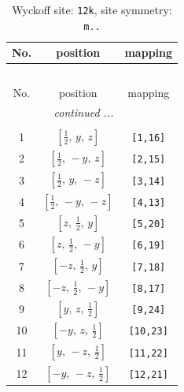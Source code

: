 \documentclass[fleqn,8pt]{jsarticle}
\begin{document}
\begin{longtable}{ccc}
\caption{Wyckoff site: {\tt 12k}, site symmetry: {\tt m..}}
 \\
 \hline \hline
No. & position & mapping \\ \hline \endfirsthead

\multicolumn{2}{l}{\tablename\ \thetable{}} \\
 \hline \hline
No. & position & mapping \\ \hline \endhead

 \hline \hline
\multicolumn{2}{r}{\footnotesize\it continued ...} \\ \endfoot

 \hline \hline
\multicolumn{2}{r}{} \\ \endlastfoot

1 & $\left[ \frac{1}{2},\, y,\, z \right]$ & {\tt [1,16]} \\ \hline
2 & $\left[ \frac{1}{2},\, - y,\, z \right]$ & {\tt [2,15]} \\ \hline
3 & $\left[ \frac{1}{2},\, y,\, - z \right]$ & {\tt [3,14]} \\ \hline
4 & $\left[ \frac{1}{2},\, - y,\, - z \right]$ & {\tt [4,13]} \\ \hline
5 & $\left[ z,\, \frac{1}{2},\, y \right]$ & {\tt [5,20]} \\ \hline
6 & $\left[ z,\, \frac{1}{2},\, - y \right]$ & {\tt [6,19]} \\ \hline
7 & $\left[ - z,\, \frac{1}{2},\, y \right]$ & {\tt [7,18]} \\ \hline
8 & $\left[ - z,\, \frac{1}{2},\, - y \right]$ & {\tt [8,17]} \\ \hline
9 & $\left[ y,\, z,\, \frac{1}{2} \right]$ & {\tt [9,24]} \\ \hline
10 & $\left[ - y,\, z,\, \frac{1}{2} \right]$ & {\tt [10,23]} \\ \hline
11 & $\left[ y,\, - z,\, \frac{1}{2} \right]$ & {\tt [11,22]} \\ \hline
12 & $\left[ - y,\, - z,\, \frac{1}{2} \right]$ & {\tt [12,21]} \\
\end{longtable}
\renewcommand{\arraystretch}{1.2}
\end{document}
